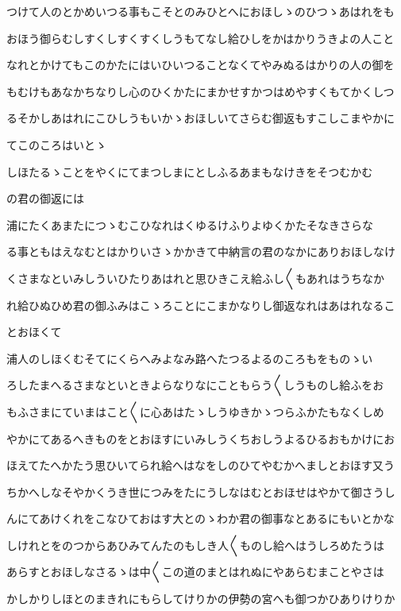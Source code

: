 \documentclass[a4paper,11pt,landscape]{ltjtarticle}
\begin{document}
\par\medskip
つけて人のとかめいつる事もこそとのみひとへにおほしゝのひつゝあはれをも
\par\medskip
おほう御らむしすくしすくすくしうもてなし給ひしをかはかりうきよの人こと
\par\medskip
なれとかけてもこのかたにはいひいつることなくてやみぬるはかりの人の御を
\par\medskip
もむけもあなかちなりし心のひくかたにまかせすかつはめやすくもてかくしつ
\par\medskip
るそかしあはれにこひしうもいかゝおほしいてさらむ御返もすこしこまやかに
\par\medskip
てこのころはいとゝ
\par\medskip
しほたるゝことをやくにてまつしまにとしふるあまもなけきをそつむかむ
\par\medskip
の君の御返には
\par\medskip
浦にたくあまたにつゝむこひなれはくゆるけふりよゆくかたそなきさらな
\par\medskip
る事ともはえなむとはかりいさゝかかきて中納言の君のなかにありおほしなけ
\par\medskip
くさまなといみしういひたりあはれと思ひきこえ給ふし〱もあれはうちなか
\par\medskip
れ給ひぬひめ君の御ふみはこゝろことにこまかなりし御返なれはあはれなるこ
\par\medskip
とおほくて
\par\medskip
浦人のしほくむそてにくらへみよなみ路へたつるよるのころもをものゝい
\par\medskip
ろしたまへるさまなといときよらなりなにこともらう〱しうものし給ふをお
\par\medskip
もふさまにていまはこと〱に心あはたゝしうゆきかゝつらふかたもなくしめ
\par\medskip
やかにてあるへきものをとおほすにいみしうくちおしうよるひるおもかけにお
\par\medskip
ほえてたへかたう思ひいてられ給へはなをしのひてやむかへましとおほす又う
\par\medskip
ちかへしなそやかくうき世につみをたにうしなはむとおほせはやかて御さうし
\par\medskip
んにてあけくれをこなひておはす大とのゝわか君の御事なとあるにもいとかな
\par\medskip
しけれとをのつからあひみてんたのもしき人〱ものし給へはうしろめたうは
\par\medskip
あらすとおほしなさるゝは中〱この道のまとはれぬにやあらむまことやさは
\par\medskip
かしかりしほとのまきれにもらしてけりかの伊勢の宮へも御つかひありけりか
\end{document}
